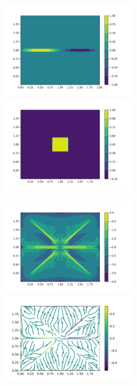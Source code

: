 \documentclass[letterpaper,12pt]{article}
\theoremstyle{plain}
\theoremstyle{remark}
\theoremstyle{remark}
\theoremstyle{remark}
\numberwithin{equation}{section}
\begin{document}
\begin{figure}
  \includegraphics[width=0.5\textwidth]{3/m1}
  \includegraphics[width=0.5\textwidth]{3/s}
\end{figure}
\begin{figure}
  \includegraphics[width=0.5\textwidth]{3/PCG}
  \includegraphics[width=0.5\textwidth]{3/vector}
\end{figure}
\end{document}

